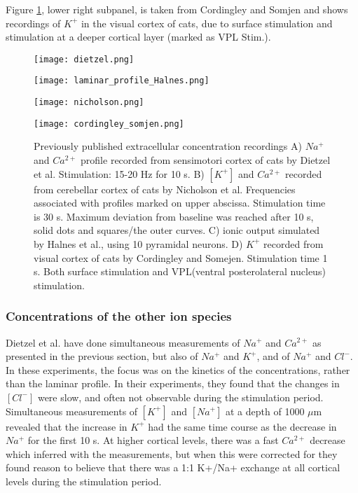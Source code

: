\documentclass{article}
\begin{document}
Figure \ref{fig:data sets}, lower right subpanel, is taken from Cordingley and Somjen and shows recordings of $K^+$ in the visual cortex of cats, due to surface stimulation and stimulation at a deeper cortical layer (marked as VPL Stim.). 
\begin{figure}[!tbp]
  \centering
  \begin{minipage}[b]{0.45\textwidth}
    \texttt{[image: dietzel.png]}
  \end{minipage}
  \hfill
  \begin{minipage}[b]{0.45\textwidth}
    \texttt{[image: laminar\_profile\_Halnes.png]}
  \end{minipage}
    \begin{minipage}[b]{0.45\textwidth}
    \texttt{[image: nicholson.png]}
  \end{minipage}
  \hfill
  \begin{minipage}[b]{0.45\textwidth}
    \texttt{[image: cordingley\_somjen.png]}
  \end{minipage}
  \caption{Previously published extracellular concentration recordings A) $Na^+$ and $Ca^{2+}$ profile recorded from sensimotori cortex of cats by Dietzel et al. Stimulation: 15-20 Hz for 10 s. B) $[K^+]$ and $Ca^{2+}$  recorded from cerebellar cortex of cats by Nicholson et al. Frequencies associated with profiles marked on upper abscissa. Stimulation time is 30 s. Maximum deviation from baseline was reached after 10 s, solid dots and squares/the outer curves. C) ionic output simulated by Halnes et al., using 10 pyramidal neurons. D) $K^+$ recorded from visual cortex of cats by Cordingley and Somejen. Stimulation time 1 s. Both surface stimulation and VPL(ventral posterolateral nucleus) stimulation.
}
  \label{fig:data sets}
\end{figure} 



\subsubsection{Concentrations of the other ion species}
 Dietzel et al. \cite{Dietzel1982} have done simultaneous measurements of $Na^+$ and $Ca^{2+}$ as presented in the previous section, but also of $Na^+$ and $K^{+}$, and of $Na^+$ and $Cl^{-}$. In these experiments, the focus was on the kinetics of the concentrations, rather than the laminar profile. In their experiments, they found that the changes in $[Cl^-]$ were slow, and often not observable during the stimulation period. Simultaneous measurements of $[K^+]$ and $[Na^+]$ at a depth of 1000 $\mu$m revealed that the increase in $K^+$ had the same time course as the decrease in $Na^+$ for the first 10 s. At higher cortical levels, there was a fast $Ca^{2+}$ decrease which inferred with the measurements, but when this were corrected for they found reason to believe that there was a 1:1 K+/Na+ exchange at all cortical levels during the stimulation period. 
 
\end{document}

